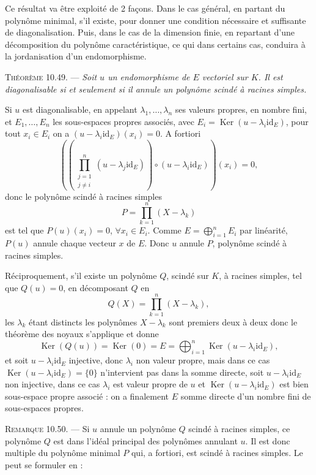 Ce résultat va être exploité de 2 façons. Dans le cas général, en partant du polynôme minimal, s'il existe, pour donner une condition nécessaire et suffisante de diagonalisation. Puis, dans le cas de la dimension finie, en repartant d'une décomposition du polynôme caractéristique, ce qui dans certains cas, conduira à la jordanisation d'un endomorphisme.

\medskip\noindent\textsc{Théorème 10.49.} --- \emph{Soit $u$ un endomorphisme de $E$ vectoriel sur $K$. Il est diagonalisable si et seulement si il annule un polynôme scindé à racines simples.}

Si $u$ est diagonalisable, en appelant $\lambda_1,\ldots,\lambda_n$ ses valeurs propres, en nombre fini, et $E_1,\ldots,E_n$ les sous-espaces propres associés, avec $E_i=\operatorname{Ker}(u-\lambda_i\mathrm{id}_E)$, pour tout $x_i\in E_i$ on a $(u-\lambda_i\mathrm{id}_E)(x_i)=0$.
A fortiori
\[
\left(\left(\prod_{\substack{j=1\\j\ne i}}^n(u-\lambda_j\mathrm{id}_E)\right)\circ(u-\lambda_i\mathrm{id}_E)\right)(x_i)=0,
\]
donc le polynôme scindé à racines simples
\[
P=\prod_{k=1}^n(X-\lambda_k)
\]
est tel que $P(u)(x_i)=0$, $\forall x_i\in E_i$. Comme $E=\bigoplus_{i=1}^nE_i$ par linéarité, $P(u)$ annule chaque vecteur $x$ de $E$. Donc $u$ annule $P$, polynôme scindé à racines simples.

Réciproquement, s'il existe un polynôme $Q$, scindé sur $K$, à racines simples, tel que $Q(u)=0$, en décomposant $Q$ en
\[
Q(X)=\prod_{k=1}^n(X-\lambda_k),
\]
les $\lambda_k$ étant distincts les polynômes $X-\lambda_k$ sont premiers deux à deux donc le théorème des noyaux s'applique et donne
\[
\operatorname{Ker}(Q(u))=\operatorname{Ker}(0)=E
=\bigoplus_{i=1}^n\operatorname{Ker}(u-\lambda_i\mathrm{id}_E),
\]
et soit $u-\lambda_i\mathrm{id}_E$ injective, donc $\lambda_i$ non valeur propre, mais dans ce cas $\operatorname{Ker}(u-\lambda_i\mathrm{id}_E)=\{0\}$ n'intervient pas dans la somme directe, soit $u-\lambda_i\mathrm{id}_E$ non injective, dans ce cas $\lambda_i$ est valeur propre de $u$ et $\operatorname{Ker}(u-\lambda_i\mathrm{id}_E)$ est bien sous-espace propre associé : on a finalement $E$ somme directe d'un nombre fini de sous-espaces propres. \bookend

\medskip\noindent\textsc{Remarque 10.50.} --- Si $u$ annule un polynôme $Q$ scindé à racines simples, ce polynôme $Q$ est dans l'idéal principal des polynômes annulant $u$. Il est donc multiple du polynôme minimal $P$ qui, a fortiori, est scindé à racines simples. Le  peut se formuler en :

